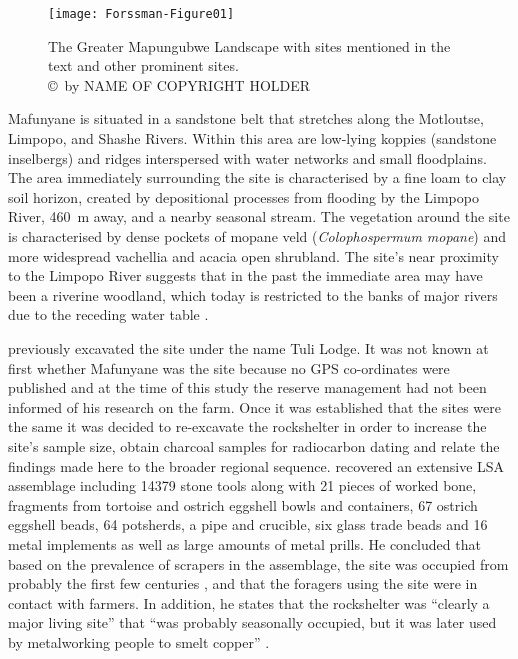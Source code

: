 \begin{figure}
		\texttt{[image: Forssman-Figure01]}
 \caption{The Greater Mapungubwe Landscape with sites mentioned in the text and other prominent sites.
     {\normalfont \\ \copyright\ by NAME OF COPYRIGHT HOLDER}}
		\label{fig:Forssman-Figure01}
\end{figure}

Mafunyane  is situated in a sandstone belt that stretches along the Motloutse, Limpopo, and Shashe Rivers. Within this area are low-lying koppies (sandstone inselbergs) and ridges interspersed with water networks and small floodplains. The area immediately surrounding the site is characterised by a fine loam to clay soil horizon, created by depositional processes from flooding by the Limpopo River, \SI{460}{\meter} away, and a nearby seasonal stream. 
	The vegetation around the site is characterised by dense pockets of mopane veld (\emph{Colophospermum mopane}) and more widespread vachellia and acacia open shrubland. The site’s near proximity to the Limpopo River suggests that in the past the immediate area may have been a riverine woodland, which today is restricted to the banks of major rivers due to the receding water table \parencite{Alexander_1984}. 
	
	\textcite{Walker_1994} previously excavated the site under the name Tuli Lodge. It was not known at first whether Mafunyane was the \textcite{Walker_1994} site because no GPS co-ordinates were published and at the time of this study the reserve management had not been informed of his research on the farm. Once it was established that the sites were the same it was decided to re-excavate the rockshelter in order to increase the site’s sample size, obtain charcoal samples for radiocarbon dating and relate the findings made here to the broader regional sequence. \textcite{Walker_1994} recovered an extensive LSA assemblage including \num{14379} stone tools along with 21 pieces of worked bone, fragments from tortoise and ostrich eggshell bowls and containers, 67 ostrich eggshell beads, 64 potsherds, a pipe and crucible, six glass trade beads and 16 metal implements as well as large amounts of metal prills. 
	He concluded that based on the prevalence of scrapers in the assemblage, the site was occupied from probably the first few centuries \AD, and that the foragers using the site were in contact with farmers. 
In addition, he states that the rockshelter was \enquote{clearly a major living site} that 
	\enquote{was probably seasonally occupied, but it was later used by metalworking people to smelt copper} \parencite[10]{Walker_1994}. 
	
